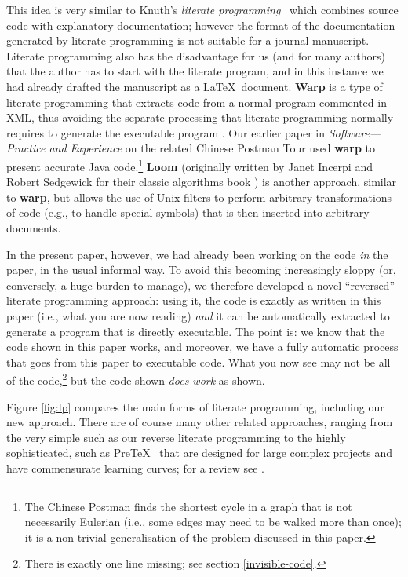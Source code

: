 \documentclass[12pt]{article}
\def\name#1{\textbf{#1}}
\begin{document}
This idea is very similar to Knuth's \emph{literate programming}~\cite{litprog} which combines source code with explanatory documentation; however the format of the documentation generated by literate programming is not suitable for a journal manuscript. Literate programming also has the disadvantage for us (and for many authors) that the author has to start with the literate program, and in this instance we had already drafted the manuscript as a \LaTeX\ document. \name{Warp\/} is a type of literate programming that extracts code from a normal program commented in XML, thus avoiding the separate processing that literate programming normally requires to generate the executable program \cite{warp}. Our earlier paper in \emph{Software---Practice and Experience\/} on the related Chinese Postman Tour \cite{cpp} used \name{warp\/} to present accurate Java code.\footnote{The Chinese Postman finds the shortest cycle in a graph that is not necessarily Eulerian (i.e., some edges may need to be walked more than once); it is a non-trivial generalisation of the problem discussed in this paper.} \name{Loom\/} \cite{loom} (originally written by Janet Incerpi and Robert Sedgewick for their classic algorithms book \cite{sedgeoriginalbook}) is another approach, similar to \name{warp\/}, but allows the use of Unix filters to perform arbitrary transformations of code (e.g., to handle special symbols) that is then inserted into arbitrary documents. 

In the present paper, however, we had already been working on the code \emph{in\/} the paper, in the usual informal way. To avoid this becoming increasingly sloppy (or, conversely, a huge burden to manage), we therefore developed a novel ``reversed'' literate programming approach: using it, the code is exactly as written in this paper (i.e., what you are now reading) \emph{and\/} it can be automatically extracted to generate a program that is directly executable. The point is: we know that the code shown in this paper works, and moreover, we have a fully automatic process that goes from this paper to executable code. What you now see may not be all of the code,\footnote{There is exactly one line missing; see section \ref{invisible-code}.} but the code shown \emph{does work\/} as shown.  


Figure \ref{fig:lp} compares the main forms of literate programming, including our new approach. There are of course many other related approaches, ranging from the very simple such as our reverse literate programming to the highly sophisticated, such as Pre\TeX\ \cite{pretex} that are designed for large complex projects and have commensurate learning curves; for a review see \cite{warp}.
\end{document}
